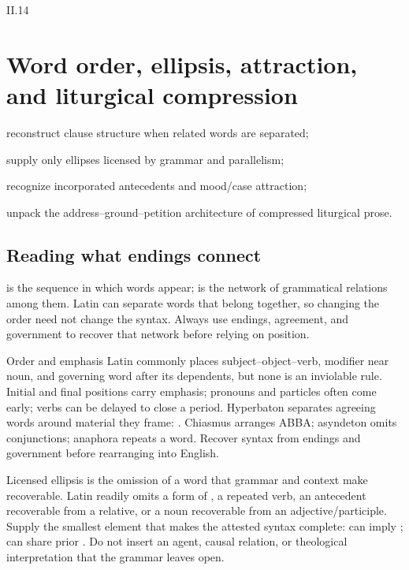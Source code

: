 \begin{courseunit}{II.14}
\chapter{Word order, ellipsis, attraction, and liturgical compression}

\begin{learningobjectives}
  \item reconstruct clause structure when related words are separated;
  \item supply only ellipses licensed by grammar and parallelism;
  \item recognize incorporated antecedents and mood/case attraction;
  \item unpack the address--ground--petition architecture of compressed liturgical prose.
\end{learningobjectives}

\section{Reading what endings connect}

 is the sequence in which words appear;  is the
network of grammatical relations among them. Latin can separate words that
belong together, so changing the order need not change the syntax. Always use
endings, agreement, and government to recover that network before relying on
position.

\begin{grammarbox}{Order and emphasis}
Latin commonly places subject--object--verb, modifier near noun, and governing word after its
dependents, but none is an inviolable rule.  Initial and final positions carry emphasis;
pronouns and particles often come early; verbs can be delayed to close a period.  Hyperbaton
separates agreeing words around material they frame: .
Chiasmus arranges ABBA; asyndeton omits conjunctions; anaphora repeats a word.  Recover syntax
from endings and government before rearranging into English.
\end{grammarbox}

\begin{grammarbox}{Licensed ellipsis}
 is the omission of a word that grammar and context make
recoverable. Latin readily omits a form of , a repeated verb, an antecedent recoverable from a
relative, or a noun recoverable from an adjective/participle.  Supply the smallest element that
makes the attested syntax complete:  can imply ;
 can share prior .  Do not insert an agent, causal relation, or
theological interpretation that the grammar leaves open.
\end{grammarbox}


\end{courseunit}
